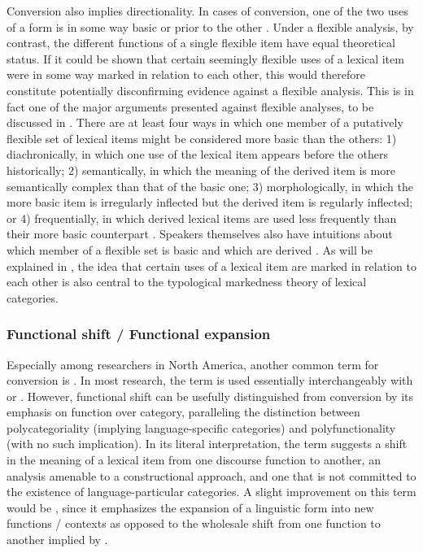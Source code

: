 Conversion also implies directionality. In cases of conversion, one of the two uses of a form is in some way basic or prior to the other \parencites[156]{Mithun2017}[5]{VapnarskyVeneziano2017a}. Under a flexible analysis, by contrast, the different functions of a single flexible item have equal theoretical status. If it could be shown that certain seemingly flexible uses of a lexical item were in some way marked in relation to each other, this would therefore constitute potentially disconfirming evidence against a flexible analysis. This is in fact one of the major arguments presented against flexible analyses, to be discussed in . There are at least four ways in which one member of a putatively flexible set of lexical items might be considered more basic than the others: 1) diachronically, in which one use of the lexical item appears before the others historically; 2) semantically, in which the meaning of the derived item is more semantically complex than that of the basic one; 3) morphologically, in which the more basic item is irregularly inflected but the derived item is regularly inflected; or 4) frequentially, in which derived lexical items are used less frequently than their more basic counterpart \parencite[108--111]{Plag2003}. Speakers themselves also have intuitions about which member of a flexible set is basic and which are derived \parencite[166]{Mithun2017}. As will be explained in , the idea that certain uses of a lexical item are marked in relation to each other is also central to the typological markedness theory of lexical categories.

\subsubsection{Functional shift / Functional expansion}
\label{sec:2.3.1.8}

Especially among researchers in North America, another common term for conversion is  \parencite{Cannon1985}. In most research, the term is used essentially interchangeably with  or . However, functional shift can be usefully distinguished from conversion by its emphasis on function over category, paralleling the distinction between polycategoriality (implying language-specific categories) and polyfunctionality (with no such implication). In its literal interpretation, the term suggests a shift in the meaning of a lexical item from one discourse function to another, an analysis amenable to a constructional approach, and one that is not committed to the existence of language-particular categories. A slight improvement on this term would be , since it emphasizes the expansion of a linguistic form into new functions / contexts as opposed to the wholesale shift from one function to another implied by .

